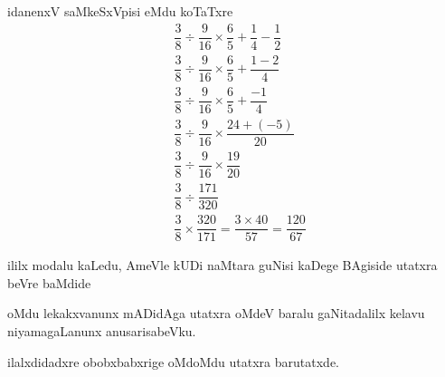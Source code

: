 idanenxV saMkeSxVpisi eMdu koTaTxre
\begin{align*}
& \dfrac{3}{8}\div \dfrac{9}{16}\times\dfrac{6}{5}+\dfrac{1}{4}-\dfrac{1}{2}\\
& \dfrac{3}{8}\div \dfrac{9}{16}\times\dfrac{6}{5}+\dfrac{1-2}{4}\\
& \dfrac{3}{8}\div \dfrac{9}{16}\times \dfrac{6}{5}+\dfrac{-1}{4}\\
& \dfrac{3}{8}\div \dfrac{9}{16}\times \dfrac{24+(-5)}{20}\\
& \dfrac{3}{8}\div \dfrac{9}{16}\times \dfrac{19}{20}\\
& \dfrac{3}{8}\div \dfrac{171}{320}\\
& \dfrac{3}{8}\times \dfrac{320}{171}=\dfrac{3\times 40}{57}=\dfrac{120}{67}
\end{align*}

ililx modalu kaLedu, AmeVle kUDi naMtara guNisi kaDege BAgiside utatxra beVre baMdide

oMdu lekakxvanunx mADidAga utatxra oMdeV baralu gaNitadalilx kelavu niyamagaLanunx anusarisabeVku.

ilalxdidadxre obobxbabxrige oMdoMdu utatxra barutatxde.


